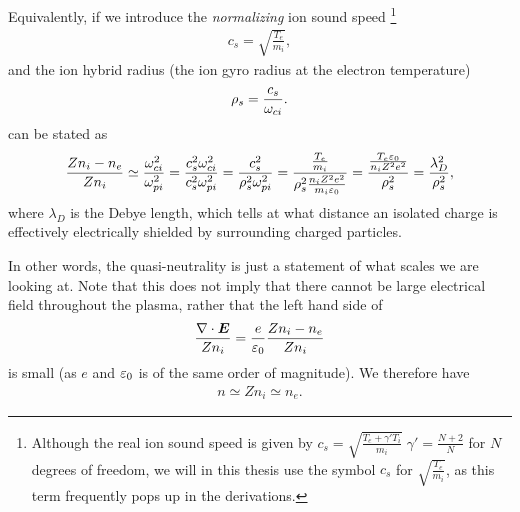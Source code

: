 Equivalently, if we introduce the \emph{normalizing} ion sound speed%
%
\footnote{Although the real ion sound speed is given by $c_s=\sqrt{\frac{T_e+\gamma' T_i}{m_i}}\;\gamma'=\frac{N+2}{N}$ for $N$ degrees of freedom, we will in this thesis use the symbol $c_s$ for $\sqrt{\frac{T_e}{m_i}}$, as this term frequently pops up in the derivations.}
%
\begin{align*}
    c_s = \sqrt{\frac{T_e}{m_i}},
\end  {align*}
%
and the ion hybrid radius (the ion gyro radius at the electron temperature)
%
\begin{align*}
    \rho_s=\frac{c_s}{\omega_{ci}}.
\end  {align*}
%
 can be stated as
%
\begin{align*}
    \frac{Zn_i - n_e}{Zn_i}
    \simeq
    \frac{\omega_{ci}^2}{\omega_{pi}^2}
    =
    \frac{c_s^2\omega_{ci}^2}{c_s^2\omega_{pi}^2}
    =
    \frac{c_s^2}{\rho_s^2\omega_{pi}^2}
    =
    \frac{\frac{T_e}{m_i}}{\rho_s^2\frac{n_iZ^2e^2}{m_i\varepsilon_0}}
    =
    \frac{\frac{T_e\varepsilon_0}{n_iZ^2e^2}}{\rho_s^2}
    =
    \frac{\lambda_D^2}{\rho_s^2},
\end{align*}
%
where $\lambda_D$ is the Debye length, which tells at what distance an isolated charge is effectively electrically shielded by surrounding charged particles.

In other words, the quasi-neutrality is just a statement of what scales we are looking at.
Note that this does not imply that there cannot be large electrical field throughout the plasma, rather that the left hand side of
%
\begin{align*}
    \frac{\nabla\cdot \boldsymbol{E}}{Zn_i} = \frac{e}{\varepsilon_0} \frac{Zn_i-n_e}{Zn_i}
\end{align*}
%
is small (as $e$ and $\varepsilon_0$ is of the same order of magnitude).
We therefore have
%
\begin{align*}
    n\simeq Zn_i \simeq n_e.
\end{align*}

